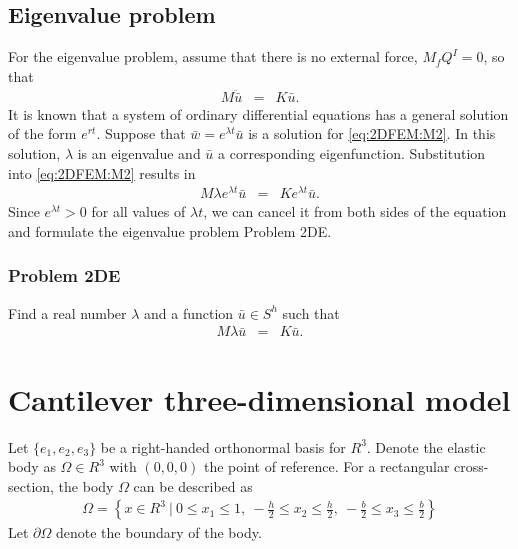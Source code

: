 \subsection*{Eigenvalue problem}\label{2dFEM_EP}
For the eigenvalue problem, assume that there is no external force, $M_{f}Q^I = 0$, so that 
\begin{eqnarray}
		M\ddot{\bar{u}} & = & K\bar{u}.\label{eq:2DFEM:M2}
\end{eqnarray}
It is known that a system of ordinary differential equations has a general solution of the form $e^{rt}$. Suppose that $\bar{w} = e^{\lambda t} \bar{u}$ is a solution for \eqref{eq:2DFEM:M2}. In this solution, $\lambda$ is an eigenvalue and $\bar{u}$ a corresponding eigenfunction. Substitution into \eqref{eq:2DFEM:M2} results in
\begin{eqnarray*}
	M\lambda e^{\lambda t}\bar{u} & = & Ke^{\lambda t}\bar{u}.
\end{eqnarray*}
Since $e^{\lambda t} > 0$ for all values of $\lambda t$, we can cancel it from both sides of the equation and formulate the eigenvalue problem Problem 2DE.

\subsubsection*{Problem 2DE}
Find a real number $\lambda$ and a function $\bar{u} \in S^h$ such that
\begin{eqnarray}
	M\lambda{\bar{u}} & = & K\bar{u}.
\end{eqnarray}

\section{Cantilever three-dimensional model} \label{ssec:3D_Model:FEM}
	Let $\{e_1,e_2,e_3\}$ be a right-handed orthonormal basis for $R^3$. Denote the elastic body as $\Omega \in R^3$ with $(0,0,0)$ the point of reference. For a rectangular cross-section, the body $\Omega$ can be described as
	\begin{eqnarray*}
		\Omega = \left\{ x \in R^3 \ | \ 0 \leq x_1 \leq 1, \ -\frac{h}{2} \leq x_2 \leq \frac{h}{2} , \ -\frac{b}{2} \leq x_3 \leq \frac{b}{2}\right \}
	\end{eqnarray*}
	Let $\partial \Omega$ denote the boundary of the body.

